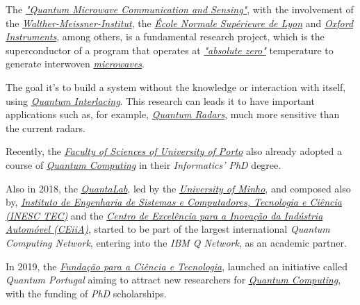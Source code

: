 \documentclass[conference]{IEEEtran}
\begin{document}
\vspace{4pt}

The \href{https://ec.europa.eu/digital-single-market/en/content/qmics-quantum-microwave-communication-and-sensing}{\textit{"Quantum Microwave Communication and Sensing"}}, with the involvement of the \href{https://www.wmi.badw.de/}{\textit{Walther-Meissner-Institut}}, the \href{http://www.ens-lyon.fr/}{\textit{École Normale Supérieure de Lyon}} and \href{https://www.oxinst.com/}{\textit{Oxford Instruments}}, among others, is a fundamental research project, which is the superconductor of a program that operates at \href{https://en.wikipedia.org/wiki/Absolute_zero}{\textit{"absolute zero"}} temperature to generate interwoven \href{https://en.wikipedia.org/wiki/Microwave}{\textit{microwaves}}.

\vspace{4pt}

The goal it's to build a system without the knowledge or interaction with itself, using \href{https://en.wikipedia.org/wiki/Quantum_entanglement}{\textit{Quantum Interlacing}}. This research can leads it to have important applications such as, for example, \href{https://en.wikipedia.org/wiki/Quantum_radar}{\textit{Quantum Radars}}, much more sensitive than the current radars.

\vspace{4pt}

Recently, the \href{https://sigarra.up.pt/fcup/pt/web_page.inicial}{\textit{Faculty of Sciences of University of Porto}} also already adopted a course of \href{https://en.wikipedia.org/wiki/Quantum_computing}{\textit{Quantum Computing}} in their \textit{Informatics' PhD} degree.

\vspace{4pt}

Also in 2018, the \href{http://www.quantalab.org/}{\textit{QuantaLab}}, led by the \href{https://www.uminho.pt/PT}{\textit{University of Minho}}, and composed also by, \href{https://www.inesctec.pt/en}{\textit{Instituto de Engenharia de Sistemas e Computadores, Tecnologia e Ci\^encia (INESC TEC)}} and the \href{https://www.ceiia.com/}{\textit{Centro de Excel\^encia para a Inova\c{c}\"ao da Ind\'ustria Autom\'ovel (CEiiA)}}, started to be part of the largest international \textit{Quantum Computing Network}, entering into the \textit{IBM Q Network}, as an academic partner.

\vspace{4pt}

In 2019, the \href{https://www.fct.pt/}{\textit{Funda\c{c}\~{a}o para a Ci\^{e}ncia e Tecnologia}}, launched an initiative called \textit{Quantum Portugal} aiming to attract new researchers for \href{https://en.wikipedia.org/wiki/Quantum_computing}{\textit{Quantum Computing}}, with the funding of \textit{PhD} scholarships.
\end{document}
